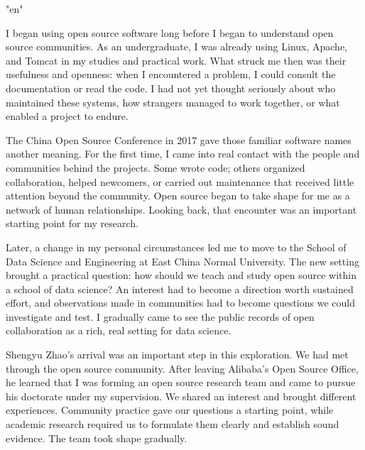 \begingroup
\XeTeXlinebreaklocale "en"
\normalfont\fontsize{11}{13}\selectfont
\setlength{\parskip}{1pt plus .3pt}
\thispagestyle{opening}
\label{origins:en}
\par
\vspace{10pt}
\par
\vspace{17pt}
I began using open source software long before I began to understand open source communities. As an undergraduate, I was already using Linux, Apache, and Tomcat in my studies and practical work. What struck me then was their usefulness and openness: when I encountered a problem, I could consult the documentation or read the code. I had not yet thought seriously about who maintained these systems, how strangers managed to work together, or what enabled a project to endure.

The China Open Source Conference in 2017 gave those familiar software names another meaning. For the first time, I came into real contact with the people and communities behind the projects. Some wrote code; others organized collaboration, helped newcomers, or carried out maintenance that received little attention beyond the community. Open source began to take shape for me as a network of human relationships. Looking back, that encounter was an important starting point for my research.

Later, a change in my personal circumstances led me to move to the School of Data Science and Engineering at East China Normal University. The new setting brought a practical question: how should we teach and study open source within a school of data science? An interest had to become a direction worth sustained effort, and observations made in communities had to become questions we could investigate and test. I gradually came to see the public records of open collaboration as a rich, real setting for data science.

Shengyu Zhao's arrival was an important step in this exploration. We had met through the open source community. After leaving Alibaba's Open Source Office, he learned that I was forming an open source research team and came to pursue his doctorate under my supervision. We shared an interest and brought different experiences. Community practice gave our questions a starting point, while academic research required us to formulate them clearly and establish sound evidence. The team took shape gradually.

